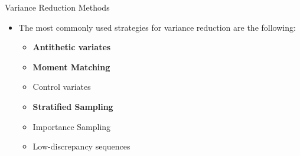 \documentclass[11pt]{beamer}
\begin{document}
\begin{frame}{Variance Reduction Methods}
\begin{itemize}
\item The most commonly used strategies for variance reduction are the following:
\begin{itemize}
\item \textbf{Antithetic variates}
\item \textbf{Moment Matching}
\item Control variates
\item \textbf{Stratified Sampling} 
\item Importance Sampling
\item Low-discrepancy sequences
\end{itemize}
\end{itemize}
\end{frame}
\end{document}
